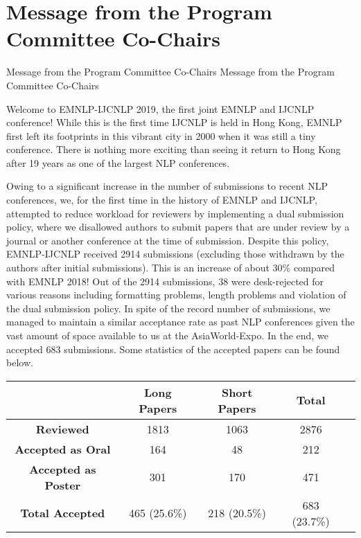 \section{Message from the Program Committee Co-Chairs}
\setheaders%
    {Message from the Program Committee Co-Chairs}%
    {Message from the Program Committee Co-Chairs}
\thispagestyle{emptyheader}


\setlength{\parskip}{.7ex}

Welcome to EMNLP-IJCNLP 2019, the first joint EMNLP and IJCNLP conference! While this is the first time IJCNLP is held in Hong Kong, EMNLP first left its footprints in this vibrant city in 2000 when it was still a tiny conference. There is nothing more exciting than seeing it return to Hong Kong after 19 years as one of the largest NLP conferences.

Owing to a significant increase in the number of submissions to recent NLP conferences, we, for the first time in the history of EMNLP and IJCNLP, attempted to reduce workload for reviewers by implementing a dual submission policy, where we disallowed authors to submit papers that are under review by a journal or another conference at the time of submission. Despite this policy, EMNLP-IJCNLP received 2914 submissions (excluding those withdrawn by the authors after initial submissions). This is an increase of about 30\% compared with EMNLP 2018! Out of the 2914 submissions, 38 were desk-rejected for various reasons including formatting problems, length problems and violation of the dual submission policy. In spite of the record number of submissions, we managed to maintain a similar acceptance rate as past NLP conferences given the vast amount of space available to us at the AsiaWorld-Expo. In the end, we accepted 683 submissions. Some statistics of the accepted papers can be found below.

\begin{table}[h]
    \begin{center}
\begin{tabular}[h]{|c|c|c|c|c|}
\hline
    & \textbf{Long Papers} & \textbf{Short Papers} & \textbf{Total} \\
\hline
    \textbf{Reviewed} & 1813 & 1063 & 2876 \\
\hline
    \textbf{Accepted as Oral} & 164 &  48 & 212 \\
\hline
    \textbf{Accepted as Poster} & 301 & 170 & 471 \\
\hline
    \textbf{Total Accepted} & 465 (25.6\%) &  218 (20.5\%) & 683 (23.7\%) \\
\hline
\end{tabular}
    \end{center}
\end{table}

